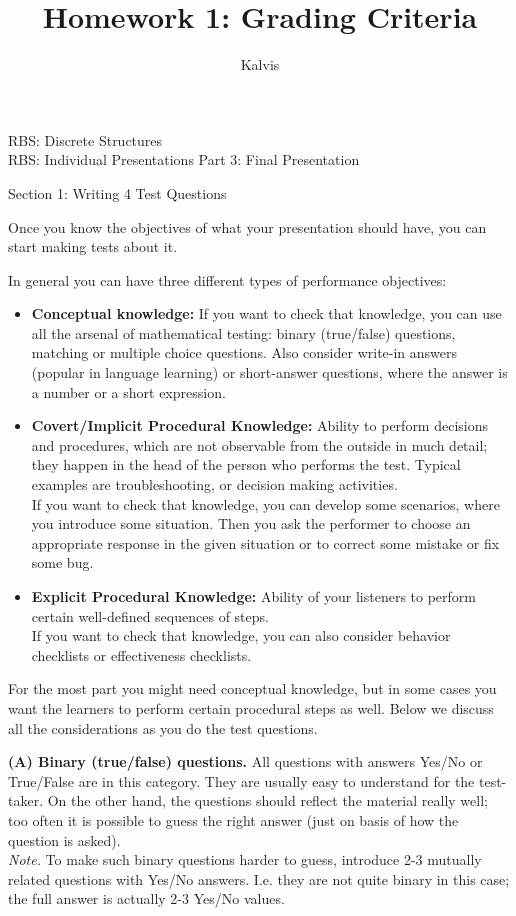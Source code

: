 \documentclass[jou]{apa6}
\title{Homework 1: Grading Criteria}
\author{Kalvis}
\affiliation{RBS}
\begin{document}
\thispagestyle{empty}

\twocolumn

\begin{center}
{\Large RBS: Discrete Structures}\\
{\Large RBS: Individual Presentations Part 3: Final Presentation}
\end{center}


\vspace{20pt}
{\large Section 1: Writing 4 Test Questions}

Once you know the objectives of what your presentation should have, 
you can start making tests about it. 

In general you can have three different types of performance objectives:
\begin{itemize}
\item {\bf Conceptual knowledge:} 
If you want to check that knowledge, you can use all the arsenal of mathematical testing: 
binary (true/false) questions, matching or multiple choice questions. Also consider
write-in answers (popular in language learning) or short-answer questions, where the answer is a number or
a short expression.
\item {\bf Covert/Implicit Procedural Knowledge:} Ability to perform decisions and procedures, which 
are not observable from the outside in much detail; they happen in the head of the person who performs the test. 
Typical examples are troubleshooting, or decision making activities.\\
If you want to check that knowledge, you can develop some scenarios, where you introduce
some situation. Then you ask the performer to choose an appropriate response in 
the given situation or to correct some mistake or fix some bug.
\item {\bf Explicit Procedural Knowledge:} Ability of your listeners to perform certain well-defined sequences of steps.\\
If you want to check that knowledge, you can also
consider behavior checklists or effectiveness checklists.
\end{itemize}

For the most part you might need conceptual knowledge, but in some cases you want the
learners to perform certain procedural steps as well. 
Below we discuss all the considerations as you do the test questions. 

{\bf (A) Binary (true/false) questions.} All questions with answers Yes/No or True/False are in this category. 
They are usually easy to understand for the test-taker. On the other hand, the questions should reflect
the material really well; too often it is possible to guess the right answer (just on basis of how the question 
is asked).\\
{\em Note.} To make such binary questions harder to guess, 
introduce 2-3 mutually related questions with Yes/No answers. I.e. they are not quite binary in this case; 
the full answer is actually 2-3 Yes/No values.
\end{document}
